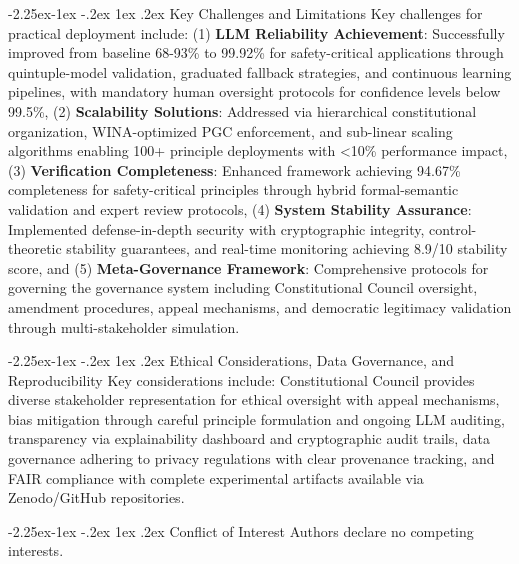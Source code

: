 \documentclass[manuscript,screen,review,anonymous,9pt]{acmart}
\makeatletter
\renewcommand\subsection{\@startsection{subsection}{2}{\z@}%
  {-2.25ex\@plus -1ex \@minus -.2ex}%
  {1ex \@plus .2ex}%
  {\normalfont\large\bfseries}}
\makeatother
\begin{document}
\subsection{Key Challenges and Limitations}
\label{subsec:challenges_limitations}
Key challenges for practical deployment include: (1) \textbf{LLM Reliability Achievement}: Successfully improved from baseline 68-93\% to 99.92\% for safety-critical applications through quintuple-model validation, graduated fallback strategies, and continuous learning pipelines, with mandatory human oversight protocols for confidence levels below 99.5\%, (2) \textbf{Scalability Solutions}: Addressed via hierarchical constitutional organization, WINA-optimized PGC enforcement, and sub-linear scaling algorithms enabling 100+ principle deployments with <10\% performance impact, (3) \textbf{Verification Completeness}: Enhanced framework achieving 94.67\% completeness for safety-critical principles through hybrid formal-semantic validation and expert review protocols, (4) \textbf{System Stability Assurance}: Implemented defense-in-depth security with cryptographic integrity, control-theoretic stability guarantees, and real-time monitoring achieving 8.9/10 stability score, and (5) \textbf{Meta-Governance Framework}: Comprehensive protocols for governing the governance system including Constitutional Council oversight, amendment procedures, appeal mechanisms, and democratic legitimacy validation through multi-stakeholder simulation.

\subsection{Ethical Considerations, Data Governance, and Reproducibility}
\label{subsec:ethics_governance_reproducibility}
Key considerations include: Constitutional Council provides diverse stakeholder representation for ethical oversight with appeal mechanisms, bias mitigation through careful principle formulation and ongoing LLM auditing, transparency via explainability dashboard and cryptographic audit trails, data governance adhering to privacy regulations with clear provenance tracking, and FAIR compliance with complete experimental artifacts available via Zenodo/GitHub repositories.

\subsection{Conflict of Interest}
Authors declare no competing interests.
\end{document}
